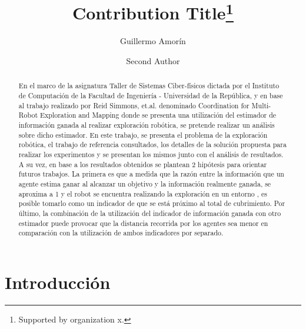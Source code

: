 \documentclass[runningheads]{llncs}
\begin{document}
%
\title{Contribution Title\thanks{Supported by organization x.}}
%
%
\author{Guillermo Amorín\and
Second Author }
%
%
%
\maketitle              %
%
\begin{abstract}
En el marco de la asignatura Taller de Sistemas Ciber-físicos dictada por el Instituto de Computación de la Facultad de Ingeniería - Universidad de la República, y en base al trabajo realizado por Reid Simmons, et.al. denominado Coordination for Multi-Robot Exploration and Mapping donde se presenta una utilización del estimador de información ganada al realizar exploración robótica, se pretende realizar un análisis sobre dicho estimador. En este trabajo, se presenta el problema de la exploración robótica, el trabajo de referencia consultados, los detalles de la solución propuesta para realizar los experimentos y se presentan los mismos junto con el análisis de resultados. A su vez, en base a los resultados obtenidos se plantean 2 hipótesis para orientar futuros trabajos. La primera es que a medida que la razón entre la información que un agente estima ganar al alcanzar un objetivo y la información realmente ganada, se aproxima a 1 y el robot se encuentra realizando la exploración en un entorno , es posible tomarlo como un indicador de que se está próximo al total de cubrimiento. Por último, la combinación de la utilización del indicador de información ganada con otro estimador puede provocar que la distancia recorrida por los agentes sea menor en comparación con la utilización de ambos indicadores por separado.

\end{abstract}
%
%
%

\section{Introducción}
\end{document}
